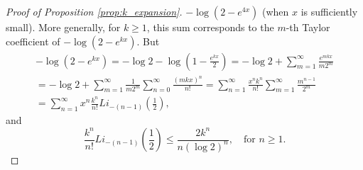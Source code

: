 \documentclass[11pt]{amsart}
\theoremstyle{plain}
\theoremstyle{remark}
\numberwithin{equation}{section}
\begin{document}
\begin{proof}[Proof of Proposition \ref{prop:k_expansion}]
$-\log(2-e^{4x})$ (when $x$ is sufficiently small). More generally, for $k\geq 1$, this sum corresponds to the $m$-th Taylor coefficient of $-\log(2-e^{kx})$. But
\begin{multline}
-\log(2-e^{kx})=-\log 2 -\log\left(1-\frac{e^{kx}}{2}\right)
= -\log 2 +\sum_{m=1}^{\infty}\frac{e^{mkx}}{m2^m}
\\=-\log 2 +\sum_{m=1}^{\infty}\frac{1}{m2^m}
\sum_{n=0}^{\infty}\frac{(mkx)^n}{n!}
=
\sum_{n=1}^{\infty}\frac{x^n k^n}{n!}
\sum_{m=1}^{\infty}\frac{m^{n-1}}{2^m}
\\=\sum_{n=1}^{\infty}x^n\frac{k^n}{n!}Li_{-(n-1)}\left(\frac{1}{2}\right),
\end{multline}
and 
$$\frac{k^n}{n!}Li_{-(n-1)}\left(\frac{1}{2}\right)\leq \frac{2k^n}{n(\log 2)^n},\quad \text{for } n\geq 1.
$$
\end{proof}
\end{document}
